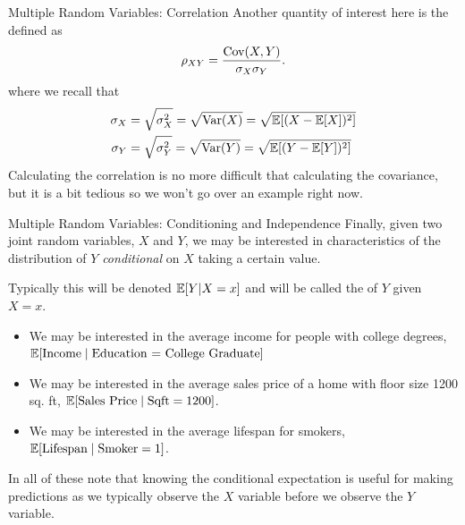 \documentclass[notheorems,9pt]{beamer}
\begin{document}
\begin{frame}{Multiple Random Variables: Correlation} 
	\label{frame:mrv-correlation}
	Another quantity of interest here is the  defined as 
	\[
		\rho_{XY} = \frac{\operatorname{Cov}(X,Y)}{\sigma_X\sigma_Y} 
	.\] 
	where we recall that
	\begin{align*}
		\sigma_X &= \sqrt{\sigma_X^2} = \sqrt{\operatorname{Var}(X)} = \sqrt{\mathbb{E}[(X-\mathbb{E}[X])^2]} \\
		\sigma_Y &= \sqrt{\sigma_Y^2} = \sqrt{\operatorname{Var}(Y)} = \sqrt{\mathbb{E}[(Y-\mathbb{E}[Y])^2]}
	\end{align*}
	\onslide<2->
	Calculating the correlation is no more difficult that calculating the covariance, but it is a bit tedious so we won't go over an example right now. 
\end{frame}
\begin{frame}{Multiple Random Variables: Conditioning and Independence} 
	\label{frame:mrv-conditioning}
	Finally, given two joint random variables, \(X\) and \(Y\), we may be interested in characteristics of the distribution of \(Y\) \emph{conditional} on \(X\) taking a certain value. 

	Typically this will be denoted \(\mathbb{E}[Y|X=x]\) and will be called the  of \(Y\) given \(X=x\).
	\onslide<2->
	\begin{itemize}
		\item<2-> We may be interested in the average income for people with college degrees, \(\mathbb{E}[\text{Income} \mid \text{Education = College Graduate}]\)
		\item<3-> We may be interested in the average sales price of a home with floor size 1200 sq. ft, \(\mathbb{E}[\text{Sales Price}\mid\text{Sqft} = 1200]\).
		\item<4-> We may be interested in the average lifespan for smokers, \(\mathbb{E}[\text{Lifespan}\mid\text{Smoker}=1]\).
	\end{itemize}
	In all of these note that knowing the conditional expectation is useful for making predictions as we typically observe the \(X\) variable before we observe the \(Y\) variable.
\end{frame}
\end{document}
